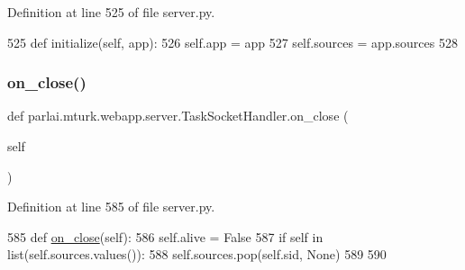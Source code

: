 Definition at line 525 of file server.\+py.


\begin{DoxyCode}
525     \textcolor{keyword}{def }initialize(self, app):
526         self.app = app
527         self.sources = app.sources
528 
\end{DoxyCode}
\mbox{\label{classparlai_1_1mturk_1_1webapp_1_1server_1_1TaskSocketHandler_a9bf75a90b26ccfe8ba72a5cea8612035}} 
\subsubsection{\texorpdfstring{on\+\_\+close()}{on\_close()}}
{\footnotesize\ttfamily def parlai.\+mturk.\+webapp.\+server.\+Task\+Socket\+Handler.\+on\+\_\+close (\begin{DoxyParamCaption}\item[{}]{self }\end{DoxyParamCaption})}



Definition at line 585 of file server.\+py.


\begin{DoxyCode}
585     \textcolor{keyword}{def }\hyperlink{namespaceparlai_1_1chat__service_1_1services_1_1terminal__chat_1_1client_a02c04f40cfa11defbf5c83bbe46aba00}{on\_close}(self):
586         self.alive = \textcolor{keyword}{False}
587         \textcolor{keywordflow}{if} self \textcolor{keywordflow}{in} list(self.sources.values()):
588             self.sources.pop(self.sid, \textcolor{keywordtype}{None})
589 
590 
\end{DoxyCode}
\mbox{\label{classparlai_1_1mturk_1_1webapp_1_1server_1_1TaskSocketHandler_a5d4b5ce22544ee8eab0063586b9e5fe8}} 
